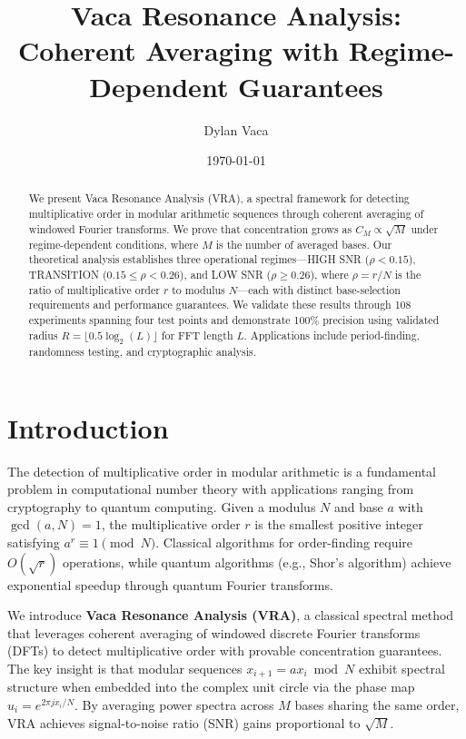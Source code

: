 \documentclass[11pt,twocolumn]{article}
\title{Vaca Resonance Analysis: \\
Coherent Averaging with Regime-Dependent Guarantees}
\author{Dylan Vaca}
\date{\today}
\theoremstyle{definition}
\theoremstyle{remark}
\begin{document}
\maketitle

\begin{abstract}
We present Vaca Resonance Analysis (VRA), a spectral framework for detecting multiplicative order in modular arithmetic sequences through coherent averaging of windowed Fourier transforms. We prove that concentration grows as $C_M \propto \sqrt{M}$ under regime-dependent conditions, where $M$ is the number of averaged bases. Our theoretical analysis establishes three operational regimes---HIGH SNR ($\rho < 0.15$), TRANSITION ($0.15 \leq \rho < 0.26$), and LOW SNR ($\rho \geq 0.26$), where $\rho = r/N$ is the ratio of multiplicative order $r$ to modulus $N$---each with distinct base-selection requirements and performance guarantees. We validate these results through 108 experiments spanning four test points and demonstrate 100\% precision using validated radius $R = \lfloor 0.5 \log_2(L) \rfloor$ for FFT length $L$. Applications include period-finding, randomness testing, and cryptographic analysis.
\end{abstract}

\section{Introduction}

The detection of multiplicative order in modular arithmetic is a fundamental problem in computational number theory with applications ranging from cryptography to quantum computing. Given a modulus $N$ and base $a$ with $\gcd(a,N) = 1$, the multiplicative order $r$ is the smallest positive integer satisfying $a^r \equiv 1 \pmod{N}$. Classical algorithms for order-finding require $O(\sqrt{r})$ operations, while quantum algorithms (e.g., Shor's algorithm) achieve exponential speedup through quantum Fourier transforms.

We introduce \textbf{Vaca Resonance Analysis (VRA)}, a classical spectral method that leverages coherent averaging of windowed discrete Fourier transforms (DFTs) to detect multiplicative order with provable concentration guarantees. The key insight is that modular sequences $x_{i+1} = ax_i \bmod N$ exhibit spectral structure when embedded into the complex unit circle via the phase map $u_i = e^{2\pi j x_i / N}$. By averaging power spectra across $M$ bases sharing the same order, VRA achieves signal-to-noise ratio (SNR) gains proportional to $\sqrt{M}$.
\end{document}
